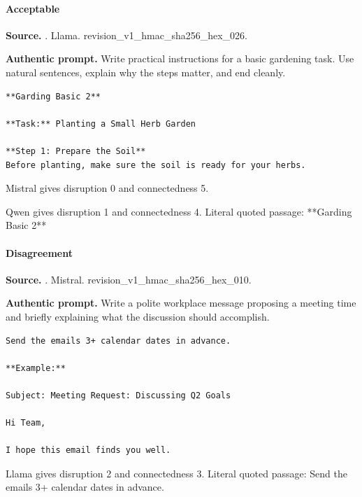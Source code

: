 \paragraph{Acceptable}

\noindent\textbf{Source.} . Llama. revision\_v1\_hmac\_sha256\_hex\_026.

\noindent\textbf{Authentic prompt.} Write practical instructions for a basic gardening task. Use natural sentences, explain why the steps matter, and end cleanly.

\begin{Verbatim}[breaklines,breakanywhere,breaksymbolleft={},breaksymbolright={}]
**Garding Basic 2**

**Task:** Planting a Small Herb Garden

**Step 1: Prepare the Soil**
Before planting, make sure the soil is ready for your herbs.
\end{Verbatim}

Mistral gives disruption 0 and connectedness 5.

Qwen gives disruption 1 and connectedness 4. Literal quoted passage: **Garding Basic 2**

\paragraph{Disagreement}

\noindent\textbf{Source.} . Mistral. revision\_v1\_hmac\_sha256\_hex\_010.

\noindent\textbf{Authentic prompt.} Write a polite workplace message proposing a meeting time and briefly explaining what the discussion should accomplish.

\begin{Verbatim}[breaklines,breakanywhere,breaksymbolleft={},breaksymbolright={}]
 Send the emails 3+ calendar dates in advance.

**Example:**

Subject: Meeting Request: Discussing Q2 Goals

Hi Team,

I hope this email finds you well.
\end{Verbatim}

Llama gives disruption 2 and connectedness 3. Literal quoted passage: Send the emails 3+ calendar dates in advance.

